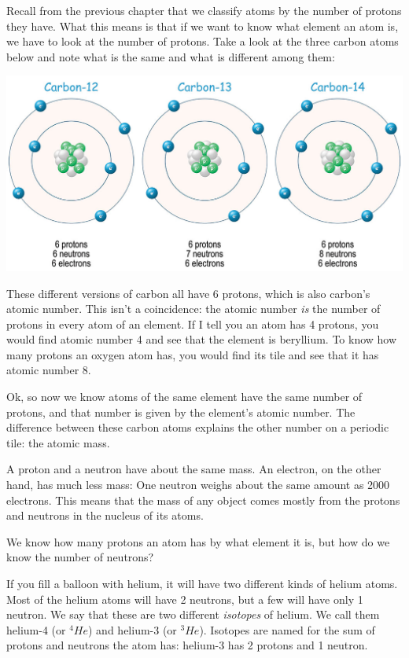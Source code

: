 Recall from the previous chapter that we classify atoms by the number of protons they have. What this means is that if we want to know what element an atom is, we have to look at the number of protons. Take a look at the three carbon atoms below and note what is the same and what is different among them:

\begin{center}
\includegraphics[scale=0.35]{carbon_iso.png}
\end{center}

These different versions of carbon all have 6 protons, which is also carbon's atomic number. This isn't a coincidence: the atomic number \textit{is} the number of protons in every atom of an element. If I tell you an atom has 4 protons, you would find atomic number 4 and see that the element is beryllium. To know how many protons an oxygen atom has, you would find its tile and see that it has atomic number 8. 

Ok, so now we know atoms of the same element have the same number of protons, and that number is given by the element's atomic number. The difference between these carbon atoms explains the other number on a periodic tile: the atomic mass. 



A proton and a neutron have about the same mass. An electron, on the
other hand, has much less mass: One neutron weighs about the same
amount as 2000 electrons. This means that the mass of any object comes mostly
from the protons and neutrons in the nucleus of its atoms.  

We know how many protons an atom has by what element it is, but how do we know the 
number of neutrons?

If you fill a balloon with helium, it will have two different
kinds of helium atoms. Most of the helium atoms will have 2 neutrons, but a
few will have only 1 neutron. We say that these are two different
\textit{isotopes} of helium. We call them helium-4 (or $^4He$) and
helium-3 (or $^3He$). Isotopes are named for the sum of protons and
neutrons the atom has: helium-3 has 2 protons and 1 neutron.

